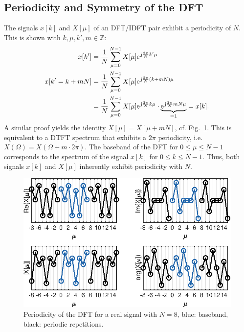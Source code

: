 \documentclass[11pt,a4paper,DIV=12]{scrartcl}
\begin{document}
\subsection{Periodicity and Symmetry of the DFT}
The signals $x[k]$ and $X[\mu]$ of an DFT/IDFT pair exhibit a periodicity of $N$.
%
This is shown with $k,\mu,k',m\in\mathbb{Z}$:
\begin{align}
x[k']&=\frac{1}{N}\sum_{\mu=0}^{N-1}X[\mu]\e^{\im\frac{2\pi}{N}k'\mu}\\
x[k'=k+m N]&=\frac{1}{N}\sum_{\mu=0}^{N-1}X[\mu]\e^{\im\frac{2\pi}{N}(k+mN)\mu}\\
&=\frac{1}{N}\sum_{\mu=0}^{N-1}X[\mu]\e^{\im\frac{2\pi}{N}k\mu}\cdot\underbrace{\e^{\im\frac{2\pi}{N}mN\mu}}_{=1}=x[k].
\end{align}
%
A similar proof yields the identity $X[\mu]=X[\mu+mN]$, cf.
Fig.~\ref{Periodicity_DFT}.
%
This is equivalent to a DTFT spectrum that exhibits a $2\pi$ periodicity, i.e.
$X(\Omega)=X(\Omega+m\cdot2\pi)$.
%
The baseband of the DFT for $0\leq\mu\leq N-1$ corresponds to the spectrum of
the signal $x[k]$ for $0\leq k\leq N-1$.
%
Thus, both signals $x[k]$ and $X[\mu]$ inherently exhibit periodicity with $N$.
\begin{figure}
		\centering
		\includegraphics[width=12cm]{graphics/Periodicity_DFT}
		\caption{Periodicity of the DFT for a real signal with $N=8$,
		blue: baseband, black: periodic repetitions.}
		\label{Periodicity_DFT}
\end{figure}%
\end{document}
